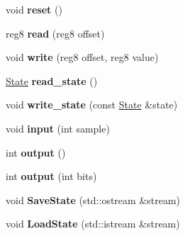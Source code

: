 \begin{DoxyCompactItemize}
\item 
\hypertarget{classSID2_ab117692438cbce246c00a16d442b4034}{void {\bfseries reset} ()}\label{classSID2_ab117692438cbce246c00a16d442b4034}

\item 
\hypertarget{classSID2_a246f62642e7d98ab8b70aacc3b377716}{reg8 {\bfseries read} (reg8 offset)}\label{classSID2_a246f62642e7d98ab8b70aacc3b377716}

\item 
\hypertarget{classSID2_ae50ffb2ed0bd1437e693a52ba901099e}{void {\bfseries write} (reg8 offset, reg8 value)}\label{classSID2_ae50ffb2ed0bd1437e693a52ba901099e}

\item 
\hypertarget{classSID2_a924bebc4cacf67e42188435976e32592}{\hyperlink{classSID2_1_1State}{State} {\bfseries read\-\_\-state} ()}\label{classSID2_a924bebc4cacf67e42188435976e32592}

\item 
\hypertarget{classSID2_a178c18f3261d3e0019e03501dcd278b0}{void {\bfseries write\-\_\-state} (const \hyperlink{classSID2_1_1State}{State} \&state)}\label{classSID2_a178c18f3261d3e0019e03501dcd278b0}

\item 
\hypertarget{classSID2_a92acca57f01c2678ffe62b51086465e5}{void {\bfseries input} (int sample)}\label{classSID2_a92acca57f01c2678ffe62b51086465e5}

\item 
\hypertarget{classSID2_a5be670b4625eb23008c7c99a226133ec}{int {\bfseries output} ()}\label{classSID2_a5be670b4625eb23008c7c99a226133ec}

\item 
\hypertarget{classSID2_ad5fe944c45f31fe3ddb3be7e51289cf2}{int {\bfseries output} (int bits)}\label{classSID2_ad5fe944c45f31fe3ddb3be7e51289cf2}

\item 
\hypertarget{classSID2_a8d2b905ac386e38d3918476e05e385e9}{void {\bfseries Save\-State} (std\-::ostream \&stream)}\label{classSID2_a8d2b905ac386e38d3918476e05e385e9}

\item 
\hypertarget{classSID2_ad3f780bac38fa98828e33cf786827122}{void {\bfseries Load\-State} (std\-::istream \&stream)}\label{classSID2_ad3f780bac38fa98828e33cf786827122}

\end{DoxyCompactItemize}
